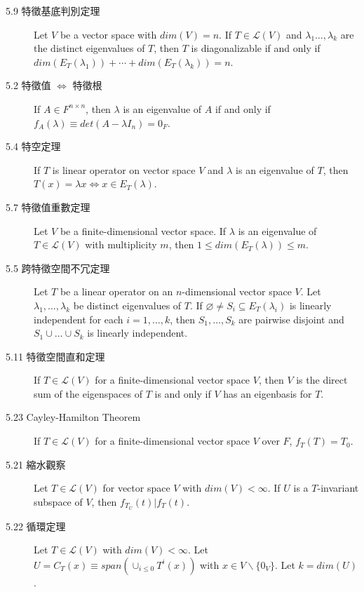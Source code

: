 \documentclass[9pt, twocolumn]{extarticle}
\begin{document}
\begin{description}
    \item[5.9  特徵基底判別定理] Let $V$ be a vector space with $dim(V) = n$. If $T \in \mathcal{L}(V)$ and $\lambda_1 \dots, \lambda_k$ are the distinct eigenvalues of $T$, then $T$ is diagonalizable if and only if $dim(E_T(\lambda_1)) + \cdots + dim(E_T(\lambda_k)) = n$.
    \item[5.2  特徵值 $\Leftrightarrow$ 特徵根] If $A \in F^{n \times n}$, then $\lambda$ is an eigenvalue of $A$ if and only if $f_A(\lambda) \equiv det(A - \lambda I_n) = 0_F$.
    \item[5.4  特空定理] If $T$ is linear operator on vector space $V$ and $\lambda$ is an eigenvalue of $T$, then $T(x) = \lambda x \Leftrightarrow x \in E_T(\lambda)$.
    \item[5.7  特徵值重數定理] Let $V$ be a finite-dimensional vector space. If $\lambda$ is an eigenvalue of $T \in \mathcal{L}(V)$ with multiplicity $m$, then $1 \leq dim(E_T(\lambda)) \leq m$.
    \item[5.5  跨特徵空間不冗定理] Let $T$ be a linear operator on an $n$-dimensional vector space $V$. Let $\lambda_1, \dots, \lambda_k$ be distinct eigenvalues of $T$. If $\varnothing \neq S_i \subseteq E_T(\lambda_i)$ is linearly independent for each $i = 1, \dots, k$, then $S_1, \dots, S_k$ are pairwise disjoint and $S_1 \cup \dots \cup S_k$ is linearly independent.
    \item[5.11 特徵空間直和定理] If $T \in \mathcal{L}(V)$ for a finite-dimensional vector space $V$, then $V$ is the direct sum of the eigenspaces of $T$ is and only if $V$ has an eigenbasis for $T$.
    \item[5.23 Cayley-Hamilton Theorem] If $T \in \mathcal{L}(V)$ for a finite-dimensional vector space $V$ over $F$, $f_T(T) = T_0$.
    \item[5.21 縮水觀察] Let $T \in \mathcal{L}(V)$ for vector space $V$ with $dim(V) < \infty$. If $U$ is a $T$-invariant subspace of $V$, then $f_{T_U}(t) | f_T(t)$.
    \item[5.22 循環定理] Let $T \in \mathcal{L}(V)$ with $dim(V) < \infty$. Let $U = C_T(x) \equiv span\left(\cup_{i \leq 0} T^i(x) \right)$ with $x \in V \backslash \{ 0_V \}$. Let $k = dim(U)$.
\end{description}
\end{document}
